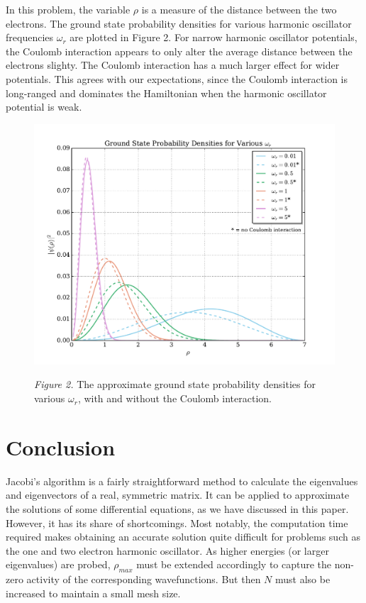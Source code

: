 \documentclass[prb,aps,twocolumn,showpacs,10pt]{revtex4-1}
\begin{document}
In this problem, the variable $\rho$ is a measure of the distance between the two electrons. The ground state probability densities for various harmonic oscillator frequencies $\omega_r$ are plotted in Figure 2. For narrow harmonic oscillator potentials, the Coulomb interaction appears to only alter the average distance between the electrons slighty. The Coulomb interaction has a much larger effect for wider potentials. This agrees with our expectations, since the Coulomb interaction is long-ranged and dominates the Hamiltonian when the harmonic oscillator potential is weak.


\begin{center}
\begin{figure}
\includegraphics[scale=0.7]{prob_dens_2e.pdf}

\textit{Figure 2.} The approximate ground state probability densities for various $\omega_r$, with and without the Coulomb interaction. 
\end{figure}
\end{center}

\section{Conclusion}

Jacobi's algorithm is a fairly straightforward method to calculate the eigenvalues and eigenvectors of a real, symmetric matrix. It can be applied to approximate the solutions of some differential equations, as we have discussed in this paper. However, it has its share of shortcomings. Most notably, the computation time required makes obtaining an accurate solution quite difficult for problems such as the one and two electron harmonic oscillator. As higher energies (or larger eigenvalues) are probed, $\rho_{max}$ must be extended accordingly to capture the non-zero activity of the corresponding wavefunctions. But then $N$ must also be increased to maintain a small mesh size.\\
\end{document}

